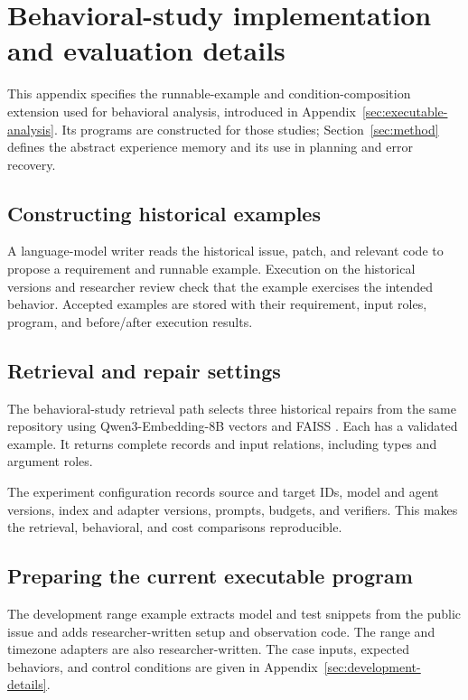 \section{Behavioral-study implementation and evaluation details}
\label{sec:method-contract}
This appendix specifies the runnable-example and condition-composition
extension used for behavioral analysis, introduced in
Appendix~\ref{sec:executable-analysis}. Its programs are constructed for those
studies; Section~\ref{sec:method} defines the abstract experience memory and
its use in planning and error recovery.
\subsection{Constructing historical examples}
A language-model writer reads the historical issue, patch, and relevant code
to propose a requirement and runnable example. Execution on the historical
versions and researcher review check that the example exercises the intended
behavior. Accepted examples are stored with their requirement, input roles,
program, and before/after execution results.

\subsection{Retrieval and repair settings}
The behavioral-study retrieval path selects three historical repairs from the same
repository using Qwen3-Embedding-8B vectors and FAISS
\citep{qwen3embedding2025}. Each has a validated example.
It returns complete records and input relations, including types and argument
roles.

The experiment configuration records source and target IDs, model and agent
versions, index and adapter versions, prompts, budgets, and verifiers.
This makes the retrieval, behavioral, and cost comparisons reproducible.

\subsection{Preparing the current executable program}
\label{sec:public-program}
The development range example extracts model and test snippets from the
public issue and adds researcher-written setup and observation code. The
range and timezone adapters are also researcher-written. The case inputs,
expected behaviors, and control conditions are given in
Appendix~\ref{sec:development-details}.


